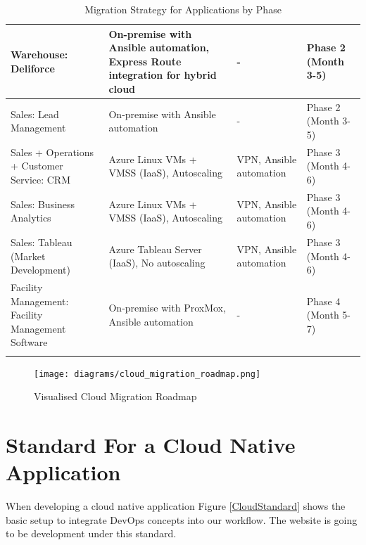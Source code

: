 \documentclass{llncs}
\begin{document}
\begin{longtable}{|p{3.1cm}|p{5.2cm}|p{3.1cm}|l|}
    \hline
    Warehouse: Deliforce & On-premise with Ansible automation, Express Route integration for hybrid cloud & - & Phase 2 (Month 3-5) \\
    \hline
    Sales: Lead Management & On-premise with Ansible automation & - & Phase 2 (Month 3-5) \\
    \hline
    Sales + Operations + Customer Service: CRM & Azure Linux VMs + VMSS (IaaS), Autoscaling & VPN, Ansible automation & Phase 3 (Month 4-6) \\
    \hline
    Sales: Business Analytics & Azure Linux VMs + VMSS (IaaS), Autoscaling & VPN, Ansible automation & Phase 3 (Month 4-6) \\
    \hline
    Sales: Tableau (Market Development) & Azure Tableau Server (IaaS), No autoscaling & VPN, Ansible automation & Phase 3 (Month 4-6) \\
    \hline
    Facility Management: Facility Management Software & On-premise with ProxMox, Ansible automation & - & Phase 4 (Month 5-7) \\
    \hline
    \caption{Migration Strategy for Applications by Phase}
    \end{longtable}

    \newpage

\begin{figure}[htbp]
        \begin{center}
            \texttt{[image: diagrams/cloud\_migration\_roadmap.png]}
            \vspace{0.01\textwidth}
            \caption{Visualised Cloud Migration Roadmap}
            \label{cloud migration roadmap} %
        \end{center}
\end{figure}
    

\section{Standard For a Cloud Native Application}

When developing a cloud native application Figure \ref{CloudStandard} shows the basic setup to integrate DevOps concepts into our workflow.
The website is going to be development under this standard.\\
\end{document}
